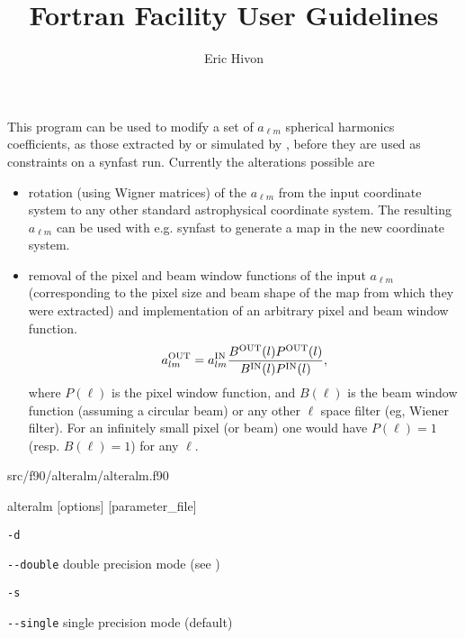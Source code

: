 
\sloppy


\title{\healpix Fortran Facility User Guidelines}
 \section[alteralm]{\nosectionname}
\label{fac:alteralm}
\author{Eric Hivon}

\begin{facility}
{This program can be used to modify a set of $a_{\ell m}$ spherical harmonics
  coefficients, as those extracted by  or 
  simulated by , before
  they are used as constraints on a synfast run. Currently the alterations
  possible are %
\begin{itemize}
    \item rotation (using Wigner matrices) of the $a_{\ell m}$ from the input
    coordinate system to any other standard astrophysical coordinate system. The
    resulting $a_{\ell m}$ can be used with e.g. synfast to generate a map in the
    new coordinate system.
    \item removal of the pixel and beam window functions of the input
  $a_{\ell m}$ (corresponding to the pixel size and beam shape of the map from which
  they were extracted) and implementation of an arbitrary pixel and beam window
  function.
 \begin{equation} a_{\ell m}^{\rm OUT} = a_{\ell m}^{\rm IN} \frac{B^{\rm OUT}(\ell) P^{\rm 
 OUT}(\ell)}{B^{\rm IN}(\ell) P^{\rm IN}(\ell)}, \label{eq:alteralm} \end{equation}
where $P(\ell)$ is the pixel window function, and $B(\ell)$ is the beam window
 function (assuming a circular beam) or any other $\ell$ space filter (eg,
 Wiener filter). For an infinitely small pixel (or beam) one would have $P(\ell) =
 1$ (resp. $B(\ell) = 1$) for any $\ell$.
\end{itemize}%
}%
{src/f90/alteralm/alteralm.f90}
\end{facility}

\begin{f90facility}
{alteralm [options] [parameter\_file]}
\end{f90facility}

\begin{options}
  \begin{optionlistwide}{} %
    \item[{\tt -d}]
    \item[{\tt -}{\tt -}{\tt double}] double precision mode (see 
)
    \item[{\tt -s}]
    \item[{\tt -}{\tt -}{\tt single}] single precision mode (default)
  \end{optionlistwide}
\end{options}

